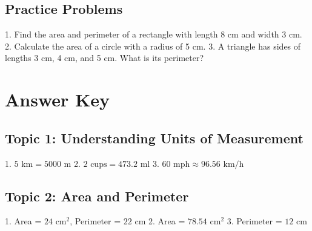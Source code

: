 \documentclass{article}
\begin{document}
\subsection*{Practice Problems}
1. Find the area and perimeter of a rectangle with length 8 cm and width 3 cm.
2. Calculate the area of a circle with a radius of 5 cm.
3. A triangle has sides of lengths 3 cm, 4 cm, and 5 cm. What is its perimeter?

\section*{Answer Key}
\subsection*{Topic 1: Understanding Units of Measurement}
1. \(5 \text{ km} = 5000 \text{ m}\)
2. \(2 \text{ cups} = 473.2 \text{ ml}\)
3. \(60 \text{ mph} \approx 96.56 \text{ km/h}\)

\subsection*{Topic 2: Area and Perimeter}
1. Area = \(24 \text{ cm}^2\), Perimeter = \(22 \text{ cm}\)
2. Area = \(78.54 \text{ cm}^2\)
3. Perimeter = \(12 \text{ cm}\)
\end{document}
